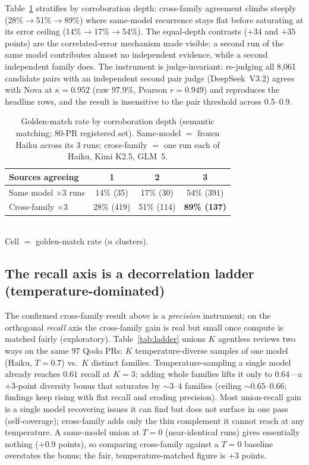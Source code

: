 \documentclass[conference]{IEEEtran}
\begin{document}
Table~\ref{tab:depth} stratifies by corroboration depth: cross-family
agreement climbs steeply (28\%${\to}$51\%${\to}$89\%) where same-model
recurrence stays flat before saturating at its error ceiling
(14\%${\to}$17\%${\to}$54\%). The equal-depth contrasts (${+}34$ and
${+}35$ points) are the correlated-error mechanism made visible: a second
run of the same model contributes almost no independent evidence, while a
second independent family does. The instrument is judge-invariant:
re-judging all 8{,}061 candidate pairs with an independent second pair
judge (DeepSeek~V3.2) agrees with Nova at $\kappa{=}0.952$ (raw 97.9\%,
Pearson $r{=}0.949$) and reproduces the headline rows, and the result is
insensitive to the pair threshold across 0.5--0.9.

\begin{table}[t]
\caption{Golden-match rate by corroboration depth (semantic matching;
80-PR registered set). Same-model $=$ frozen Haiku across its 3 runs;
cross-family $=$ one run each of Haiku, Kimi K2.5, GLM~5.}
\label{tab:depth}
\centering
\begin{tabular}{lccc}
\toprule
Sources agreeing & 1 & 2 & 3 \\
\midrule
Same model $\times$3 runs & 14\% (35) & 17\% (30) & 54\% (391) \\
Cross-family $\times$3    & 28\% (419) & 51\% (114) & \textbf{89\% (137)} \\
\bottomrule
\end{tabular}
\\[2pt]{\footnotesize Cell $=$ golden-match rate ($n$ clusters).}
\end{table}

\subsection{The recall axis is a decorrelation ladder (temperature-dominated)}
\label{sec:ladder}
The confirmed cross-family result above is a \emph{precision} instrument; on the
orthogonal \emph{recall} axis the cross-family gain is real but small once
compute is matched fairly (exploratory). Table~\ref{tab:ladder} unions $K$
agentless reviews two ways on the same 97 Qodo PRs: $K$ temperature-diverse
samples of one model (Haiku, $T{=}0.7$) vs.\ $K$ distinct families.
Temperature-sampling a single model already reaches $0.61$ recall at $K{=}3$;
adding whole families lifts it only to $0.64$---a ${+}3$-point diversity bonus
that saturates by ${\sim}3$--$4$ families (ceiling ${\sim}0.65$--$0.66$; findings
keep rising with flat recall and eroding precision). Most union-recall gain is a
single model recovering issues it can find but does not surface in one pass
(self-coverage); cross-family adds only the thin complement it cannot reach at
any temperature. A same-model union at $T{=}0$ (near-identical runs) gives
essentially nothing (${+}0.9$ points), so comparing cross-family against a
$T{=}0$ baseline overstates the bonus; the fair, temperature-matched figure is
${+}3$ points.
\end{document}
